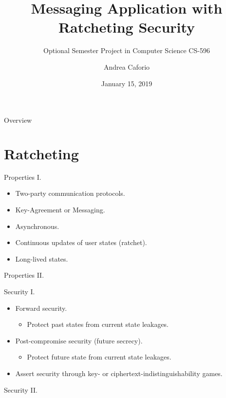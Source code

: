 \documentclass{beamer}
\title{Messaging Application with Ratcheting Security}
\subtitle{\scriptsize Optional Semester Project in Computer Science CS-596}
\date{January 15, 2019}
\author{Andrea Caforio}
\institute{École Polytechnique Fédérale de Lausanne}
\begin{document}
\maketitle

\begin{frame}{Overview}
\tableofcontents
\end{frame}

\section{Ratcheting}
\label{sec:ratcheting}

\begin{frame}{Properties I.}
  \begin{itemize}
  \item Two-party communication protocols.
  \item Key-Agreement or Messaging.
  \item Asynchronous.
  \item Continuous updates of user states (ratchet).
  \item Long-lived states.
  \end{itemize}
\end{frame}

\begin{frame}{Properties II.}
  \begin{figure}
    \centering
     
  \end{figure}
\end{frame}

\begin{frame}{Security I.}
  \begin{itemize}
  \item Forward security.
    \begin{itemize}
    \item Protect past states from current state leakages.
    \end{itemize}
  \item Post-compromise security (future secrecy).
    \begin{itemize}
    \item Protect future state from current state leakages.
    \end{itemize}
  \item Assert security through key- or ciphertext-indistinguishability games.
  \end{itemize}
\end{frame}

\begin{frame}{Security II.}
  \begin{figure}[ht]
      \centering
      \setlength{\fboxsep}{10pt}
      \scalebox{0.7}{%
      \fbox{%
        
      }
    }
  \end{figure}

  \begin{figure}[ht]
      \centering
      \setlength{\fboxsep}{10pt}
      \scalebox{0.7}{%
      \fbox{%
        
      }
    }
  \end{figure}
\end{frame}
\end{document}
